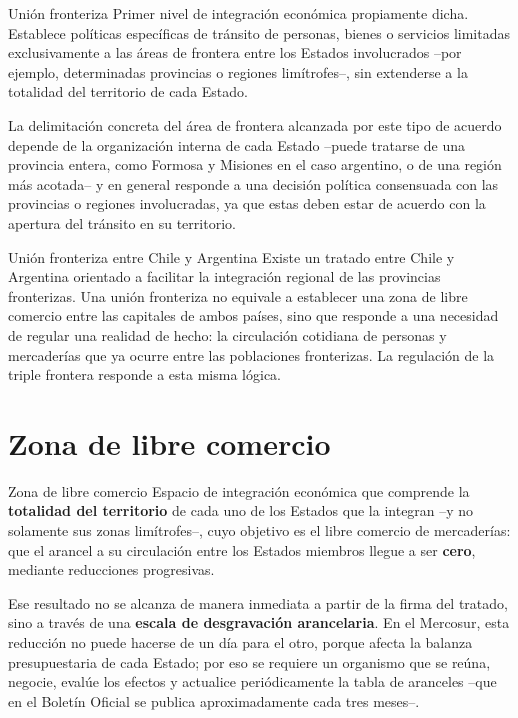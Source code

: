 \documentclass[12pt,oneside]{book}
\begin{document}
\begin{definicion}{Unión fronteriza}
Primer nivel de integración económica propiamente dicha. Establece políticas específicas de tránsito de personas, bienes o servicios limitadas exclusivamente a las áreas de frontera entre los Estados involucrados --por ejemplo, determinadas provincias o regiones limítrofes--, sin extenderse a la totalidad del territorio de cada Estado.
\end{definicion}

La delimitación concreta del área de frontera alcanzada por este tipo de acuerdo depende de la organización interna de cada Estado --puede tratarse de una provincia entera, como Formosa y Misiones en el caso argentino, o de una región más acotada-- y en general responde a una decisión política consensuada con las provincias o regiones involucradas, ya que estas deben estar de acuerdo con la apertura del tránsito en su territorio.

\begin{ejemplo}{Unión fronteriza entre Chile y Argentina}
Existe un tratado entre Chile y Argentina orientado a facilitar la integración regional de las provincias fronterizas. Una unión fronteriza no equivale a establecer una zona de libre comercio entre las capitales de ambos países, sino que responde a una necesidad de regular una realidad de hecho: la circulación cotidiana de personas y mercaderías que ya ocurre entre las poblaciones fronterizas. La regulación de la triple frontera responde a esta misma lógica.
\end{ejemplo}

\section{Zona de libre comercio}

\begin{definicion}{Zona de libre comercio}
Espacio de integración económica que comprende la \textbf{totalidad del territorio} de cada uno de los Estados que la integran --y no solamente sus zonas limítrofes--, cuyo objetivo es el libre comercio de mercaderías: que el arancel a su circulación entre los Estados miembros llegue a ser \textbf{cero}, mediante reducciones progresivas.
\end{definicion}

Ese resultado no se alcanza de manera inmediata a partir de la firma del tratado, sino a través de una \textbf{escala de desgravación arancelaria}. En el Mercosur, esta reducción no puede hacerse de un día para el otro, porque afecta la balanza presupuestaria de cada Estado; por eso se requiere un organismo que se reúna, negocie, evalúe los efectos y actualice periódicamente la tabla de aranceles --que en el Boletín Oficial se publica aproximadamente cada tres meses--.
\end{document}
